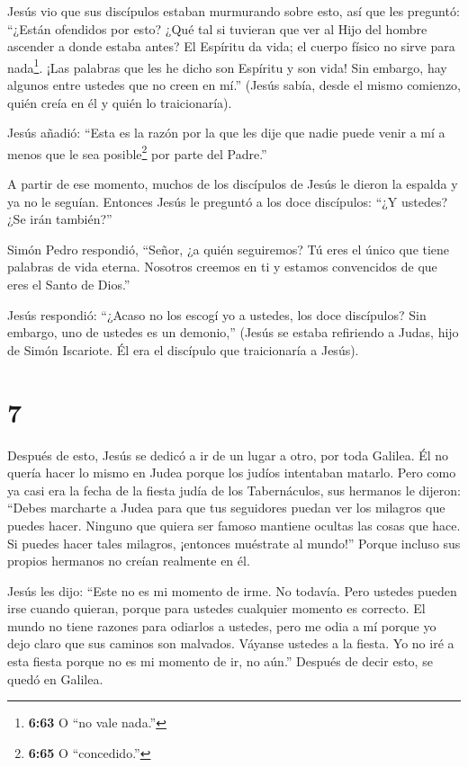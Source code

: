  Jesús vio que sus discípulos estaban murmurando sobre
esto, así que les preguntó: ``¿Están ofendidos por esto? 
¿Qué tal si tuvieran que ver al Hijo del hombre ascender a donde estaba
antes?  El Espíritu da vida; el cuerpo físico no sirve para
nada\footnote{\textbf{6:63} O ``no vale nada.''}. ¡Las palabras que les
he dicho son Espíritu y son vida!  Sin embargo, hay algunos
entre ustedes que no creen en mí.'' (Jesús sabía, desde el mismo
comienzo, quién creía en él y quién lo traicionaría).

 Jesús añadió: ``Esta es la razón por la que les dije que
nadie puede venir a mí a menos que le sea posible\footnote{\textbf{6:65}
  O ``concedido.''} por parte del Padre.''

 A partir de ese momento, muchos de los discípulos de Jesús
le dieron la espalda y ya no le seguían.  Entonces Jesús le
preguntó a los doce discípulos: ``¿Y ustedes? ¿Se irán también?''

 Simón Pedro respondió, ``Señor, ¿a quién seguiremos? Tú
eres el único que tiene palabras de vida eterna.  Nosotros
creemos en ti y estamos convencidos de que eres el Santo de Dios.''

 Jesús respondió: ``¿Acaso no los escogí yo a ustedes, los
doce discípulos? Sin embargo, uno de ustedes es un demonio,''
 (Jesús se estaba refiriendo a Judas, hijo de Simón
Iscariote. Él era el discípulo que traicionaría a Jesús).

\hypertarget{section-6}{%
\section{7}\label{section-6}}

 Después de esto, Jesús se dedicó a ir de un lugar a otro,
por toda Galilea. Él no quería hacer lo mismo en Judea porque los judíos
intentaban matarlo.  Pero como ya casi era la fecha de la
fiesta judía de los Tabernáculos,  sus hermanos le dijeron:
``Debes marcharte a Judea para que tus seguidores puedan ver los
milagros que puedes hacer.  Ninguno que quiera ser famoso
mantiene ocultas las cosas que hace. Si puedes hacer tales milagros,
¡entonces muéstrate al mundo!''  Porque incluso sus propios
hermanos no creían realmente en él.

 Jesús les dijo: ``Este no es mi momento de irme. No
todavía. Pero ustedes pueden irse cuando quieran, porque para ustedes
cualquier momento es correcto.  El mundo no tiene razones
para odiarlos a ustedes, pero me odia a mí porque yo dejo claro que sus
caminos son malvados.  Váyanse ustedes a la fiesta. Yo no
iré a esta fiesta porque no es mi momento de ir, no aún.'' 
Después de decir esto, se quedó en Galilea.

